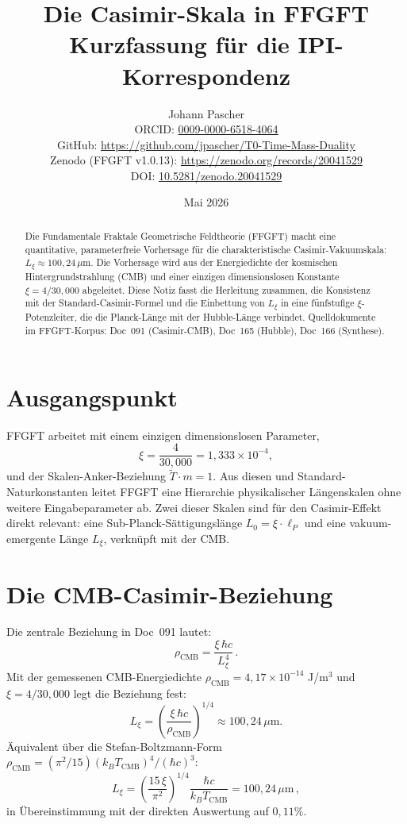 \documentclass[11pt,a4paper]{article}
\title{Die Casimir-Skala in FFGFT\\[2pt]
  \large Kurzfassung für die IPI-Korrespondenz}
\author{Johann Pascher\\[2pt]
\small ORCID: \href{https://orcid.org/0009-0000-6518-4064}{0009-0000-6518-4064}\\
\small GitHub: \url{https://github.com/jpascher/T0-Time-Mass-Duality}\\
\small Zenodo (FFGFT v1.0.13): \url{https://zenodo.org/records/20041529}\\
\small DOI: \href{https://doi.org/10.5281/zenodo.20041529}{10.5281/zenodo.20041529}}
\date{Mai 2026}
\begin{document}
\maketitle

\begin{abstract}
\noindent Die Fundamentale Fraktale Geometrische Feldtheorie (FFGFT) macht eine quantitative, parameterfreie Vorhersage für die charakteristische Casimir-Vakuumskala: $L_\xi \approx 100{,}24\,\mu$m. Die Vorhersage wird aus der Energiedichte der kosmischen Hintergrundstrahlung (CMB) und einer einzigen dimensionslosen Konstante $\xi = 4/30{,}000$ abgeleitet. Diese Notiz fasst die Herleitung zusammen, die Konsistenz mit der Standard-Casimir-Formel und die Einbettung von $L_\xi$ in eine fünfstufige $\xi$-Potenzleiter, die die Planck-Länge mit der Hubble-Länge verbindet. Quelldokumente im FFGFT-Korpus: Doc~091 (Casimir-CMB), Doc~165 (Hubble), Doc~166 (Synthese).
\end{abstract}

\section{Ausgangspunkt}

FFGFT arbeitet mit einem einzigen dimensionslosen Parameter,
\[
\xi = \frac{4}{30{,}000} = 1{,}333 \times 10^{-4},
\]
und der Skalen-Anker-Beziehung $\tilde T \cdot m = 1$. Aus diesen und Standard-Naturkonstanten leitet FFGFT eine Hierarchie physikalischer Längenskalen ohne weitere Eingabeparameter ab. Zwei dieser Skalen sind für den Casimir-Effekt direkt relevant: eine Sub-Planck-Sättigungslänge $L_0 = \xi \cdot \ell_P$ und eine vakuum-emergente Länge $L_\xi$, verknüpft mit der CMB.

\section{Die CMB-Casimir-Beziehung}

Die zentrale Beziehung in Doc~091 lautet:
\begin{equation}
\rho_{\mathrm{CMB}} = \frac{\xi \, \hbar c}{L_\xi^4}\,.
\label{eq:cmb_casimir}
\end{equation}
Mit der gemessenen CMB-Energiedichte $\rho_{\mathrm{CMB}} = 4{,}17 \times 10^{-14}$ J/m$^3$ und $\xi = 4/30{,}000$ legt die Beziehung fest:
\begin{equation}
L_\xi = \left(\frac{\xi\,\hbar c}{\rho_{\mathrm{CMB}}}\right)^{1/4} \approx 100{,}24\,\mu\text{m}.
\label{eq:Lxi_value}
\end{equation}
Äquivalent über die Stefan-Boltzmann-Form $\rho_{\mathrm{CMB}} = (\pi^2/15)(k_B T_{\mathrm{CMB}})^4 / (\hbar c)^3$:
\begin{equation}
L_\xi = \left(\frac{15\,\xi}{\pi^2}\right)^{1/4} \frac{\hbar c}{k_B T_{\mathrm{CMB}}} = 100{,}24\,\mu\text{m}\,,
\label{eq:Lxi_from_T}
\end{equation}
in Übereinstimmung mit der direkten Auswertung auf $0{,}11\%$.
\end{document}
